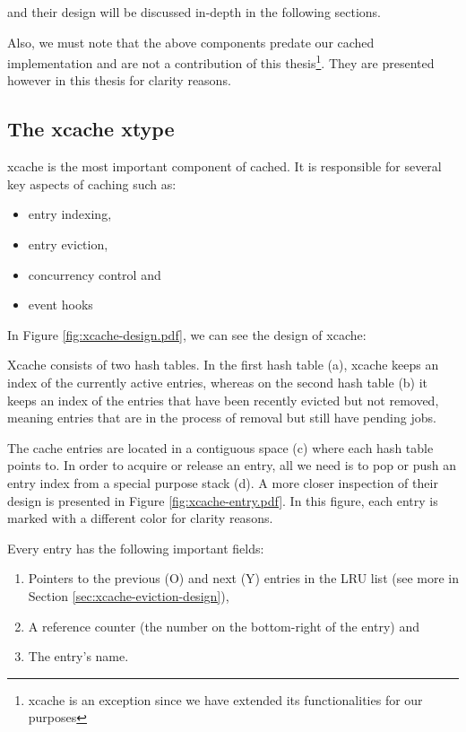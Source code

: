 and their design will be discussed in-depth in the following sections.

Also, we must note that the above components predate our cached implementation 
and are not a contribution of this thesis\footnote{xcache is an exception since 
	we have extended its functionalities for our purposes}. They are 
presented however in this thesis for clarity reasons. 

\subsection{The xcache xtype}\label{sec:xcache-design}

xcache is the most important component of cached. It is responsible for several 
key aspects of caching such as:

\begin{itemize}
	\item entry indexing,
	\item entry eviction,
	\item concurrency control and
	\item event hooks
\end{itemize}

In Figure \ref{fig:xcache-design.pdf}, we can see the design of xcache:


Xcache consists of two hash tables. In the first hash table (a), xcache keeps 
an index of the currently active entries, whereas on the second hash table (b) 
it keeps an index of the entries that have been recently evicted but not 
removed, meaning entries that are in the process of removal but still have 
pending jobs.

The cache entries are located in a contiguous space (c) where each hash table 
points to. In order to acquire or release an entry, all we need is to pop or 
push an entry index from a special purpose stack (d). A more closer inspection 
of their design is presented in Figure \ref{fig:xcache-entry.pdf}. In this 
figure, each entry is marked with a different color for clarity reasons.


Every entry has the following important fields:

\begin{enumerate}
	\item Pointers to the previous (O) and next (Y) entries in the LRU list 
		(see more in Section \ref{sec:xcache-eviction-design}),
	\item A reference counter (the number on the bottom-right of the entry) 
		and
	\item The entry's name.
\end{enumerate}

